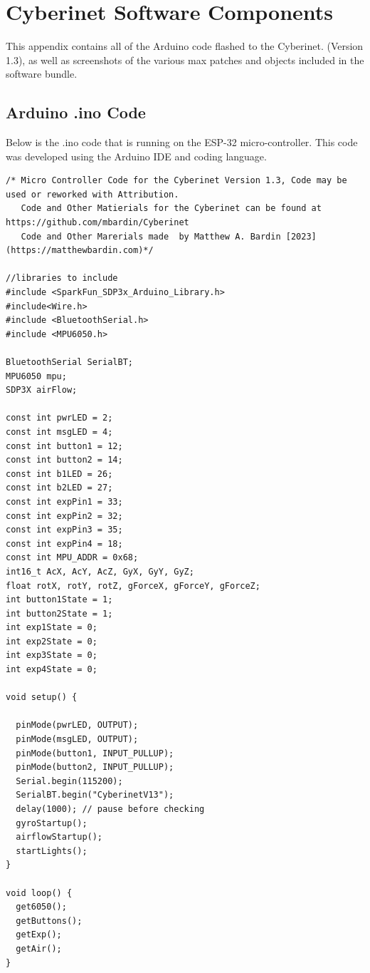 \chapter{Cyberinet Software Components}
This appendix contains all of the Arduino code flashed to the Cyberinet. (Version 1.3), as well as screenshots of the various max patches and objects included in the software bundle.

\section{Arduino .ino Code}

Below is the .ino code that is running on the ESP-32 micro-controller. This code was developed using the Arduino IDE and coding language.

\begin{lstlisting}[language=Arduino] 
/* Micro Controller Code for the Cyberinet Version 1.3, Code may be used or reworked with Attribution.
   Code and Other Matierials for the Cyberinet can be found at https://github.com/mbardin/Cyberinet
   Code and Other Marerials made  by Matthew A. Bardin [2023] (https://matthewbardin.com)*/

//libraries to include
#include <SparkFun_SDP3x_Arduino_Library.h>
#include<Wire.h>
#include <BluetoothSerial.h>
#include <MPU6050.h>

BluetoothSerial SerialBT;
MPU6050 mpu;
SDP3X airFlow;

const int pwrLED = 2; 
const int msgLED = 4; 
const int button1 = 12;
const int button2 = 14;
const int b1LED = 26;
const int b2LED = 27;
const int expPin1 = 33;
const int expPin2 = 32;
const int expPin3 = 35;
const int expPin4 = 18;
const int MPU_ADDR = 0x68; 
int16_t AcX, AcY, AcZ, GyX, GyY, GyZ; 
float rotX, rotY, rotZ, gForceX, gForceY, gForceZ; 
int button1State = 1;
int button2State = 1;
int exp1State = 0;
int exp2State = 0;
int exp3State = 0;
int exp4State = 0;

void setup() {

  pinMode(pwrLED, OUTPUT);
  pinMode(msgLED, OUTPUT);
  pinMode(button1, INPUT_PULLUP); 
  pinMode(button2, INPUT_PULLUP);
  Serial.begin(115200);
  SerialBT.begin("CyberinetV13"); 
  delay(1000); // pause before checking
  gyroStartup();
  airflowStartup();
  startLights();
}

void loop() {
  get6050();
  getButtons();
  getExp();
  getAir();
}


\end{lstlisting}
